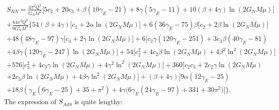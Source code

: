\documentclass[10pt,a4paper]{article}
\begin{document}
\begin{multline}\label{eq:S_2}
    S_{RN}=\frac{4\pi^2Q^2}{G_NM^2}\Big[5c_2+20c_3+\beta\left(10\gamma_E-21\right)+8\gamma\left(5\gamma_E-11\right)+10\left(\beta+4\gamma\right)\ln\left(2G_NM\mu\right)\Big]\\
   +\frac{64\pi^3Q^2}{9G^2_NM^4}\bigg\{54(\beta+4\gamma)\Big[c_1+2\alpha\ln\left(2G_NM\mu\right)\Big]
   +6(36\gamma_E-75)\beta\Big[c_2+2\beta\ln\left(2G_NM\mu\right)\Big]\\
   +48(48\gamma_E-97)\gamma\Big[c_3+2\gamma\ln\left(2G_NM\mu\right)\Big]
   +6\Big[c_2\gamma(120\gamma_E-251)+3c_3\beta(40\gamma_E-81)\\
   +4\beta\gamma(120\gamma_E-247)\ln\left(2G_NM\mu\right)\Big]
   +54\Big[c^2_2+4c_2\beta\ln\left(2G_NM\mu\right)+4\beta^2\ln^2\left(2G_NM\mu\right)\Big]\\
   +576\Big[c^2_3+4c_3\gamma\ln\left(2G_NM\mu\right)+4\gamma^2\ln^2\left(2G_NM\mu\right)\Big]
   +360\Big[c_2c_3+2c_2\gamma\ln\left(2G_NM\mu\right)\\+2c_3\beta\ln\left(2G_NM\mu\right)
   +4\beta\gamma\ln^2\left(2G_NM\mu\right)\Big]+(\beta+4\gamma)\Big[ 9\alpha(12\gamma_E-25)
   \\+18\beta\left(\gamma_E(6\gamma_E-25)+35+\pi^2\right)
   +4\gamma\big(6\gamma_E\left(24\gamma_E-97\right)+331+30\pi^2\big)\Big]
\bigg\}.
\end{multline}
The expression of $S_{AdS}$ is quite lengthy:
\end{document}
